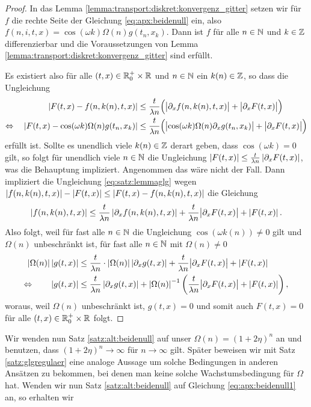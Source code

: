 \begin{proof}
In das Lemma \ref{lemma:transport:diskret:konvergenz_gitter} setzen wir für $f$ die rechte Seite der Gleichung \eqref{eq:apx:beidenull} ein, also $f(n, i, t, x) = \cos(\omega k) \Omega(n) g(t_n, x_k)$.
Dann ist $f$ für alle $n \in \mathbb N$ und $k \in \mathbb Z$ differenzierbar und die Voraussetzungen von Lemma \ref{lemma:transport:diskret:konvergenz_gitter} sind erfüllt.

Es existiert also für alle $(t,x) \in \mathbb R^+_0 \times \mathbb R$ und $n \in \mathbb N$ ein $k(n) \in \mathbb Z$, so dass die Ungleichung
\begin{align}\label{eq:satz:lemmaglg}
\begin{split}
\left| F(t, x) - f(n, k(n), t, x) \right| &\leq \frac {t}{\lambda n} \Bigl(\bigl\lvert \partial_x f(n, k(n), t, x) \bigr\rvert + \bigl\lvert \partial_x F(t, x) \bigr\rvert \Bigr)\\
\Leftrightarrow \quad \left| F(t, x) - \cos(\omega k) \Omega(n) g(t_n, x_k) \right| &\leq \frac {t}{\lambda n} \Bigl(\bigl\lvert \cos(\omega k) \Omega(n) \partial_x g(t_n, x_k) \bigr\rvert + \bigl\lvert \partial_x F(t, x) \bigr\rvert \Bigr)\\
\end{split}
\end{align}
erfüllt ist. Sollte es unendlich viele $k(n) \in \mathbb Z$ derart geben, dass $\cos(\omega k) = 0$ gilt, so folgt für unendlich viele $n \in \mathbb N$ die Ungleichung $\left| F(t, x) \right| \leq \frac {t}{\lambda n} \left| \partial_x F(t,x) \right|$, was die Behauptung impliziert.
Angenommen das wäre nicht der Fall.
Dann impliziert die Ungleichung \eqref{eq:satz:lemmaglg} wegen $\left| f(n, k(n), t, x) \right| - \left| F(t,x) \right| \leq \left| F(t, x) - f(n, k(n), t, x) \right|$ die Gleichung
\[ \left| f(n, k(n), t, x) \right| \leq \frac {t}{\lambda n} \left| \partial_x f(n, k(n), t, x) \right| +  \frac {t}{\lambda n} \bigl\lvert \partial_x F(t, x) \bigr\rvert + \left| F(t,x) \right|. \]
Also folgt, weil für fast alle $n \in \mathbb N$ die Ungleichung $\cos(\omega k(n)) \neq 0$ gilt und $\Omega(n)$ unbeschränkt ist, für fast alle $n \in \mathbb N$ mit $\Omega(n) \neq 0$
\begin{align*}
\left| \Omega(n) \right| \left| g(t,x) \right| &\leq \frac{t}{\lambda n} \cdot \left| \Omega(n) \right| \left| \partial_x g(t,x) \right| + \frac {t}{\lambda n} \bigl\lvert \partial_x F(t, x) \bigr\rvert + \left| F(t,x) \right|\\
\Leftrightarrow \qquad \left| g(t,x) \right| &\leq \frac{t}{\lambda n} \left| \partial_x g(t,x) \right| + \left| \Omega(n) \right|^{-1} \left( \frac {t}{\lambda n} \bigl\lvert \partial_x F(t, x) \bigr\rvert + \left| F(t,x) \right| \right),
\end{align*}
woraus, weil $\Omega(n)$ unbeschränkt ist, $g(t,x) = 0$ und somit auch $F(t,x) = 0$ für alle $(t,x) \in \mathbb R^+_0 \times \mathbb R$ folgt.
\end{proof}
Wir wenden nun Satz \ref{satz:alt:beidenull} auf unser $\Omega(n) = (1 + 2\eta)^n$ an und benutzen, dass $(1 + 2 \eta)^n \to \infty$ für $n \to \infty$ gilt.
Später beweisen wir mit Satz \ref{satz:glgregulaer} eine analoge Aussage um solche Bedingungen in anderen Ansätzen zu bekommen, bei denen man keine solche Wachstumsbedingung für $\Omega$ hat.
Wenden wir nun Satz \ref{satz:alt:beidenull} auf Gleichung \eqref{eq:apx:beidenull1} an, so erhalten wir
\\

